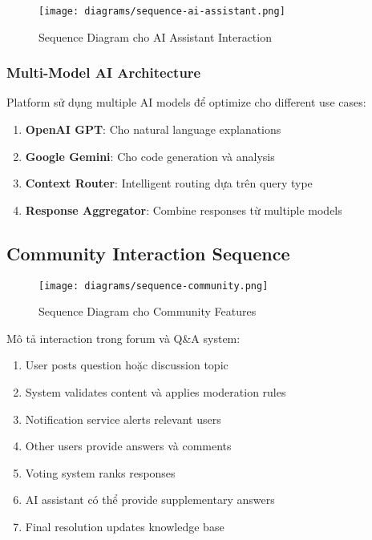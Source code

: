 \begin{figure}[H]
\centering
\texttt{[image: diagrams/sequence-ai-assistant.png]}
\caption{Sequence Diagram cho AI Assistant Interaction}
\label{fig:sequence-ai}
\end{figure}

\subsubsection{Multi-Model AI Architecture}

Platform sử dụng multiple AI models để optimize cho different use cases:

\begin{enumerate}
    \item \textbf{OpenAI GPT}: Cho natural language explanations
    \item \textbf{Google Gemini}: Cho code generation và analysis
    \item \textbf{Context Router}: Intelligent routing dựa trên query type
    \item \textbf{Response Aggregator}: Combine responses từ multiple models
\end{enumerate}

\subsection{Community Interaction Sequence}
\label{subsec:community-sequence}

\begin{figure}[H]
\centering
\texttt{[image: diagrams/sequence-community.png]}
\caption{Sequence Diagram cho Community Features}
\label{fig:sequence-community}
\end{figure}

Mô tả interaction trong forum và Q\&A system:

\begin{enumerate}
    \item User posts question hoặc discussion topic
    \item System validates content và applies moderation rules
    \item Notification service alerts relevant users
    \item Other users provide answers và comments
    \item Voting system ranks responses
    \item AI assistant có thể provide supplementary answers
    \item Final resolution updates knowledge base
\end{enumerate}
